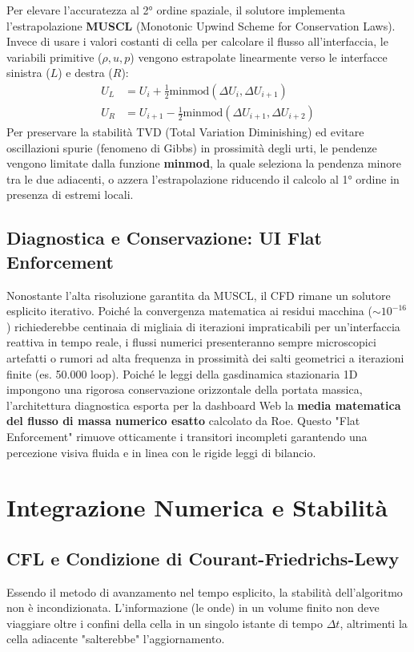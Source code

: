 \documentclass[11pt,a4paper]{article}
\begin{document}
Per elevare l'accuratezza al 2° ordine spaziale, il solutore implementa l'estrapolazione \textbf{MUSCL} (Monotonic Upwind Scheme for Conservation Laws). Invece di usare i valori costanti di cella per calcolare il flusso all'interfaccia, le variabili primitive ($\rho, u, p$) vengono estrapolate linearmente verso le interfacce sinistra ($L$) e destra ($R$):
\begin{align}
U_L &= U_i + \frac{1}{2} \text{minmod}(\Delta U_i, \Delta U_{i+1}) \\
U_R &= U_{i+1} - \frac{1}{2} \text{minmod}(\Delta U_{i+1}, \Delta U_{i+2})
\end{align}
Per preservare la stabilità TVD (Total Variation Diminishing) ed evitare oscillazioni spurie (fenomeno di Gibbs) in prossimità degli urti, le pendenze vengono limitate dalla funzione \textbf{minmod}, la quale seleziona la pendenza minore tra le due adiacenti, o azzera l'estrapolazione riducendo il calcolo al 1° ordine in presenza di estremi locali.

\subsection{Diagnostica e Conservazione: UI Flat Enforcement}
Nonostante l'alta risoluzione garantita da MUSCL, il CFD rimane un solutore esplicito iterativo. Poiché la convergenza matematica ai residui macchina ($\sim 10^{-16}$) richiederebbe centinaia di migliaia di iterazioni impraticabili per un'interfaccia reattiva in tempo reale, i flussi numerici presenteranno sempre microscopici artefatti o rumori ad alta frequenza in prossimità dei salti geometrici a iterazioni finite (es. 50.000 loop).
Poiché le leggi della gasdinamica stazionaria 1D impongono una rigorosa conservazione orizzontale della portata massica, l'architettura diagnostica esporta per la dashboard Web la \textbf{media matematica del flusso di massa numerico esatto} calcolato da Roe. Questo "Flat Enforcement" rimuove otticamente i transitori incompleti garantendo una percezione visiva fluida e in linea con le rigide leggi di bilancio.

\section{Integrazione Numerica e Stabilità}

\subsection{CFL e Condizione di Courant-Friedrichs-Lewy}
Essendo il metodo di avanzamento nel tempo esplicito, la stabilità dell'algoritmo non è incondizionata. L'informazione (le onde) in un volume finito non deve viaggiare oltre i confini della cella in un singolo istante di tempo $\Delta t$, altrimenti la cella adiacente "salterebbe" l'aggiornamento.
\end{document}
